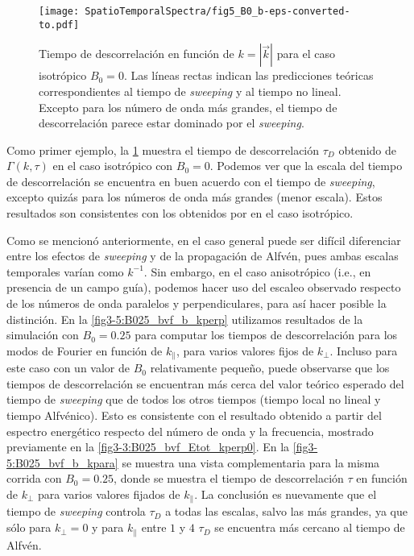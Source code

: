 \begin{figure}
  \centering
  \texttt{[image: SpatioTemporalSpectra/fig5\_B0\_b-eps-converted-to.pdf]}
  \caption{Tiempo de descorrelación en función de $k=|\vec{k}|$ para el caso
  isotrópico $B_0=0$. Las líneas rectas indican las predicciones teóricas
  correspondientes al tiempo de \textit{sweeping} y al tiempo no lineal.
  Excepto para los número de onda más grandes, el tiempo de descorrelación
  parece estar dominado por el \textit{sweeping}.}
  \label{fig3-5:B0_bvf_b_kpara_0}
\end{figure}

Como primer ejemplo, la \cref{fig3-5:B0_bvf_b_kpara_0} muestra el tiempo
de descorrelación $\tau_D$ obtenido de $\Gamma(k,\tau)$ en el caso
isotrópico con $B_0=0$.  Podemos ver que la escala del tiempo de
descorrelación se encuentra en buen acuerdo con el tiempo de
\textit{sweeping}, excepto quizás para los números de onda más grandes (menor
escala). Estos resultados son consistentes con los obtenidos
por \cite{servidio_time_2011} en el caso isotrópico.

Como se mencionó anteriormente, en el caso general puede ser difícil
diferenciar entre los efectos de \textit{sweeping} y de la propagación de
Alfvén, pues ambas escalas temporales varían como $k^{-1}$. Sin
embargo, en el caso anisotrópico (i.e., en presencia de un campo
guía), podemos hacer uso del escaleo observado respecto de los números
de onda paralelos y perpendiculares, para así hacer posible la
distinción.  En la \cref{fig3-5:B025_bvf_b_kperp} utilizamos resultados
de la simulación con $B_0=0.25$ para computar los tiempos de
descorrelación para los modos de Fourier en función de $k_\parallel$,
para varios valores fijos de $k_\perp$. Incluso para este caso con un
valor de $B_0$ relativamente pequeño, puede observarse que los tiempos
de descorrelación se encuentran más cerca del valor teórico esperado
del tiempo de \textit{sweeping} que de todos los otros tiempos (tiempo local
no lineal y tiempo Alfvénico). Esto es consistente con el resultado
obtenido a partir del espectro energético respecto del número de onda
y la frecuencia, mostrado previamente en la
\cref{fig3-3:B025_bvf_Etot_kperp0}. En la \cref{fig3-5:B025_bvf_b_kpara}
se muestra una vista complementaria para la misma corrida con
$B_0=0.25$, donde se muestra el tiempo de descorrelación $\tau$ en
función de $k_\perp$ para varios valores fijados de $k_\parallel$. La
conclusión es nuevamente que el tiempo de \textit{sweeping} controla
$\tau_D$ a todas las escalas, salvo las más grandes, ya que sólo para
$k_\perp=0$ y para $k_\parallel$ entre $1$ y $4$ $\tau_D$ se encuentra
más cercano al tiempo de Alfvén.

